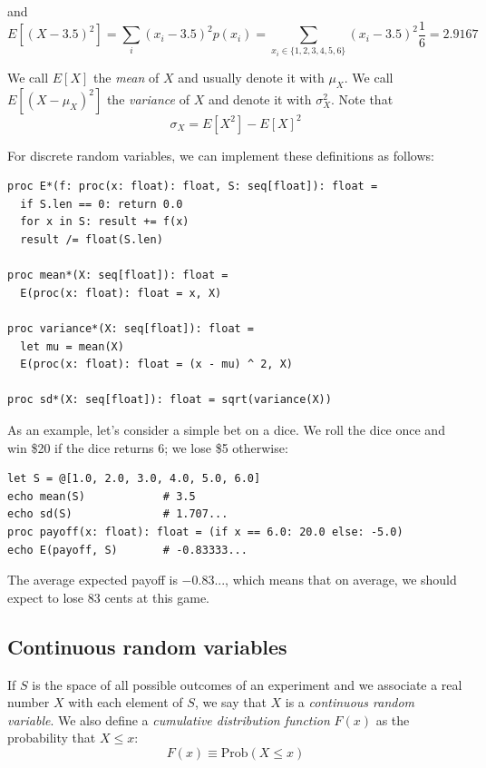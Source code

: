 \documentclass[justified, sixbynine]{tufte-book}
\def\ft{\small\tt}
\theoremstyle{plain}%
\newtheorem * {corollary}{Corollary}
\theoremstyle{definition}
\theoremstyle{remark}
\newtheorem * {remark}{Remark}
\newtheorem * {note}{Note}
\begin{document}
\begin{fullwidth}
and
\begin{equation}
E[(X-3.5)^2]=\sum_i(x_i-3.5)^2p(x_i)=\sum_{x_i\in
\{1, 2, 3, 4, 5, 6\}}(x_i-3.5)^2\frac 16=2.9167
\end{equation}

We call $E[X]$ the {\it mean} of $X$ and usually denote it with $\mu _X$.
We call $E[(X-\mu _X)^2]$ the {\it variance} of $X$ and denote it with $\sigma _X^2$. Note that
\begin{equation}
\sigma _X=E[X^2]-E[X]^2
\end{equation}

For discrete random variables, we can implement these definitions as follows:

\begin{lstlisting}[caption={in file: {\ft nlib/stats.nim}}]
proc E*(f: proc(x: float): float, S: seq[float]): float =
  if S.len == 0: return 0.0
  for x in S: result += f(x)
  result /= float(S.len)

proc mean*(X: seq[float]): float =
  E(proc(x: float): float = x, X)

proc variance*(X: seq[float]): float =
  let mu = mean(X)
  E(proc(x: float): float = (x - mu) ^ 2, X)

proc sd*(X: seq[float]): float = sqrt(variance(X))
\end{lstlisting}

As an example, let's consider a simple bet on a dice. We roll the dice once and win \$20 if the dice returns 6; we lose \$5 otherwise:

\begin{lstlisting}
let S = @[1.0, 2.0, 3.0, 4.0, 5.0, 6.0]
echo mean(S)            # 3.5
echo sd(S)              # 1.707...
proc payoff(x: float): float = (if x == 6.0: 20.0 else: -5.0)
echo E(payoff, S)       # -0.83333...
\end{lstlisting}

The average expected payoff is $-0.83...$, which means that on average, we should expect to lose 83 cents at this game.

\goodbreak\subsection{Continuous random variables}

If $S$ is the space of all possible outcomes of an experiment and we
associate a real number $X$ with each element of $S$, we say that $X$ is a {\it %
continuous random variable}. We also define a {\it cumulative distribution
function} $F(x)$ as the probability that $X\leq x$:
\begin{equation}
F(x)\equiv \textrm{Prob}(X\leq x)
\end{equation}


\end{fullwidth}
\end{document}
